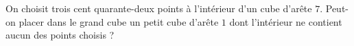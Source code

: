 On choisit trois cent quarante-deux points à l'intérieur d'un cube d'arête $7$. Peut-on placer dans le grand cube un petit cube d'arête $1$ dont l'intérieur ne contient aucun des points choisis ?
